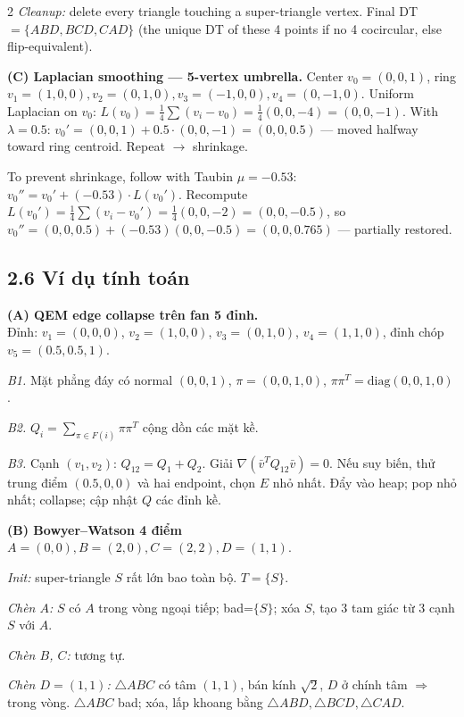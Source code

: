 \begin{paracol}{2}
\emph{Cleanup:} delete every triangle touching a super-triangle vertex. Final DT $=\{ABD,BCD,CAD\}$ (the unique DT of these 4 points if no 4 cocircular, else flip-equivalent).

\textbf{(C) Laplacian smoothing — 5-vertex umbrella.} Center $v_0=(0,0,1)$, ring $v_1\!=\!(1,0,0),v_2\!=\!(0,1,0),v_3\!=\!(-1,0,0),v_4\!=\!(0,-1,0)$. Uniform Laplacian on $v_0$:
$L(v_0)=\tfrac14\sum(v_i-v_0)=\tfrac14(0,0,-4)=(0,0,-1)$.
With $\lambda=0.5$: $v_0' = (0,0,1)+0.5\cdot(0,0,-1)=(0,0,0.5)$ — moved halfway toward ring centroid. Repeat $\to$ shrinkage.

To prevent shrinkage, follow with Taubin $\mu=-0.53$: $v_0'' = v_0' + (-0.53)\cdot L(v_0')$. Recompute $L(v_0')=\tfrac14\sum(v_i-v_0')=\tfrac14(0,0,-2)=(0,0,-0.5)$, so $v_0''=(0,0,0.5)+(-0.53)(0,0,-0.5)=(0,0,0.765)$ — partially restored.

\switchcolumn

\subsection*{2.6 Ví dụ tính toán}

\textbf{(A) QEM edge collapse trên fan 5 đỉnh.}\\
Đỉnh: $v_1\!=\!(0,0,0)$, $v_2\!=\!(1,0,0)$, $v_3\!=\!(0,1,0)$, $v_4\!=\!(1,1,0)$, đỉnh chóp $v_5=(0.5,0.5,1)$.

\emph{B1.} Mặt phẳng đáy có normal $(0,0,1)$, $\pi=(0,0,1,0)$, $\pi\pi^T=\mathrm{diag}(0,0,1,0)$.

\emph{B2.} $Q_i=\sum_{\pi\in F(i)}\pi\pi^T$ cộng dồn các mặt kề.

\emph{B3.} Cạnh $(v_1,v_2)$: $Q_{12}=Q_1+Q_2$. Giải $\nabla(\bar v^T Q_{12}\bar v)=0$. Nếu suy biến, thử trung điểm $(0.5,0,0)$ và hai endpoint, chọn $E$ nhỏ nhất. Đẩy vào heap; pop nhỏ nhất; collapse; cập nhật $Q$ các đỉnh kề.

\textbf{(B) Bowyer–Watson 4 điểm} $A=(0,0),B=(2,0),C=(2,2),D=(1,1)$.

\emph{Init:} super-triangle $S$ rất lớn bao toàn bộ. $T=\{S\}$.

\emph{Chèn $A$:} $S$ có $A$ trong vòng ngoại tiếp; bad=$\{S\}$; xóa $S$, tạo 3 tam giác từ 3 cạnh $S$ với $A$.

\emph{Chèn $B$, $C$:} tương tự.

\emph{Chèn $D=(1,1)$:} $\triangle ABC$ có tâm $(1,1)$, bán kính $\sqrt2$, $D$ ở chính tâm $\Rightarrow$ trong vòng. $\triangle ABC$ bad; xóa, lấp khoang bằng $\triangle ABD,\triangle BCD,\triangle CAD$.


\end{paracol}
